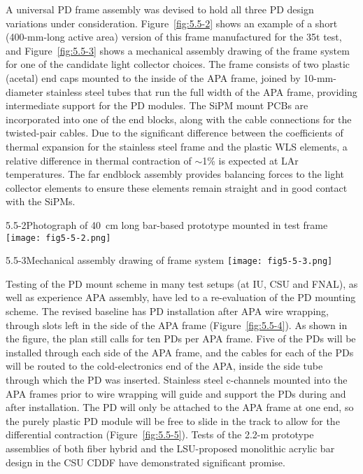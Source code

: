 A universal PD frame assembly was devised to hold all three PD design
variations under consideration.  Figure~\ref{fig:5.5-2} shows an example of a
short (400-mm-long active area) version of this frame manufactured for
the 35t test,  and Figure~\ref{fig:5.5-3} shows a mechanical assembly drawing of
the frame system for one of the candidate light collector choices.
The frame consists of two plastic (acetal) end caps mounted to the
inside of the APA frame, joined by 10-mm-diameter stainless steel tubes
that run the full width of the APA frame, providing intermediate
support for the PD modules.%
The SiPM mount PCBs  are
incorporated into one of the end blocks, along with the cable
connections for the twisted-pair cables.  Due to the significant
difference between the coefficients of thermal expansion for the stainless
steel frame and the plastic WLS elements, %
a relative
difference in thermal contraction of $\sim$1\% is expected at LAr temperatures.  The
far endblock assembly provides balancing forces to the light collector
elements %
to ensure these elements remain %
straight and
in good contact with the SiPMs.

\begin{cdrfigure}{5.5-2}{Photograph of 40~cm long bar-based prototype mounted in test frame}
  \texttt{[image: fig5-5-2.png]}
\end{cdrfigure}


\begin{cdrfigure}{5.5-3}{Mechanical assembly drawing of frame system}
  \texttt{[image: fig5-5-3.png]}
\end{cdrfigure}


Testing of the PD mount scheme in many test setups (at IU, CSU and
FNAL), as well as experience APA assembly, have led to a re-evaluation
of the PD mounting scheme.  The revised baseline \fixme{} has PD installation
after APA wire wrapping, through slots left in the side
of the APA frame (Figure~\ref{fig:5.5-4}).  As shown in the figure, the
plan still calls for ten PDs per APA frame.  Five of the PDs will be
installed through each side of the APA frame, and the cables for each
of the PDs will be routed to the cold-electronics end of the APA,
inside the side tube through which the PD was inserted.  Stainless steel
c-channels mounted into the APA frames prior to wire wrapping will
guide and support the PDs during and after installation.  The PD will
only be attached to the APA frame at one end, so the purely plastic PD
module will be free to slide in the track to allow for the
differential contraction (Figure~\ref{fig:5.5-5}).  Tests of the 2.2-m prototype
assemblies of both fiber hybrid and the LSU-proposed monolithic
acrylic bar design in the CSU CDDF  have demonstrated significant
promise.  %

